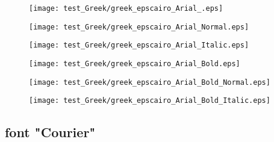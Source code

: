 \documentclass{ltjsarticle}
\begin{document}
			\begin{figure}[ht]
				\centering
				\begin{minipage}{0.3\columnwidth}
					\texttt{[image: test\_Greek/greek\_epscairo\_Arial\_.eps]}
				\end{minipage}
				\begin{minipage}{0.3\columnwidth}
					\texttt{[image: test\_Greek/greek\_epscairo\_Arial\_Normal.eps]}
				\end{minipage}
				\begin{minipage}{0.3\columnwidth}
					\texttt{[image: test\_Greek/greek\_epscairo\_Arial\_Italic.eps]}
				\end{minipage}
				\begin{minipage}{0.3\columnwidth}
					\texttt{[image: test\_Greek/greek\_epscairo\_Arial\_Bold.eps]}
				\end{minipage}
				\begin{minipage}{0.3\columnwidth}
					\texttt{[image: test\_Greek/greek\_epscairo\_Arial\_Bold\_Normal.eps]}
				\end{minipage}
				\begin{minipage}{0.3\columnwidth}
					\texttt{[image: test\_Greek/greek\_epscairo\_Arial\_Bold\_Italic.eps]}
				\end{minipage}
			\end{figure}
			\clearpage%

			\subsection{font "Courier"}
	
\end{document}

